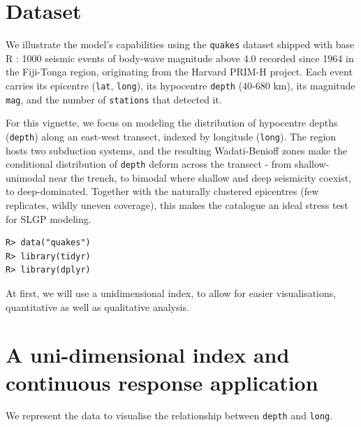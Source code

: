 \documentclass[
]{article}
\begin{document}
\section{Dataset}\label{dataset}

We illustrate the model's capabilities using the \texttt{quakes} dataset shipped with base R \citep{r_core_team}: 1000 seismic events of body-wave magnitude above 4.0 recorded since 1964 in the Fiji-Tonga region, originating from the Harvard PRIM-H project. Each event carries its epicentre (\texttt{lat}, \texttt{long}), its hypocentre \texttt{depth} (40-680 km), its magnitude \texttt{mag}, and the number of \texttt{stations} that detected it.

For this vignette, we focus on modeling the distribution of hypocentre depths (\texttt{depth}) along an east-west transect, indexed by longitude (\texttt{long}). The region hosts two subduction systems, and the resulting Wadati-Benioff zones \citep{isacks_seismology_1968, frohlich_deep_2006} make the conditional distribution of \texttt{depth} deform across the transect - from shallow-unimodal near the trench, to bimodal where shallow and deep seismicity coexist, to deep-dominated. Together with the naturally clustered epicentres (few replicates, wildly uneven coverage), this makes the catalogue an ideal stress test for SLGP modeling.

\begin{verbatim}
R> data("quakes")
R> library(tidyr)
R> library(dplyr)
\end{verbatim}

At first, we will use a unidimensional index, to allow for easier visualisations, quantitative as well as qualitative analysis.

\section{A uni-dimensional index and continuous response application}\label{a-uni-dimensional-index-and-continuous-response-application}

We represent the data to visualise the relationship between \texttt{depth} and \texttt{long}.
\end{document}

